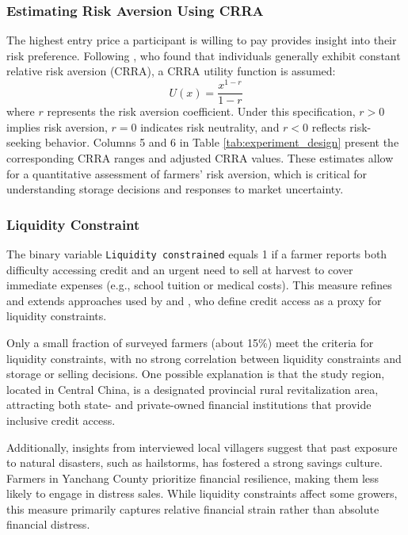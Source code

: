 \subsubsection{Estimating Risk Aversion Using CRRA}  
\noindent The highest entry price a participant is willing to pay provides insight into their risk preference. Following \cite{chiappori2011relative}, who found that individuals generally exhibit constant relative risk aversion (CRRA), a CRRA utility function is assumed:  
\[
U(x) = \frac{x^{1-r}}{1 - r}
\]  
where \( r \) represents the risk aversion coefficient. Under this specification, \( r > 0 \) implies risk aversion, \( r = 0 \) indicates risk neutrality, and \( r < 0 \) reflects risk-seeking behavior. Columns 5 and 6 in Table \ref{tab:experiment_design} present the corresponding CRRA ranges and adjusted CRRA values. These estimates allow for a quantitative assessment of farmers' risk aversion, which is critical for understanding storage decisions and responses to market uncertainty.  

\subsubsection{Liquidity Constraint}  
\noindent The binary variable \texttt{Liquidity constrained} equals 1 if a farmer reports both difficulty accessing credit and an urgent need to sell at harvest to cover immediate expenses (e.g., school tuition or medical costs). This measure refines and extends approaches used by \cite{albuquerque2024market} and \cite{stephens2011incomplete}, who define credit access as a proxy for liquidity constraints.  

Only a small fraction of surveyed farmers (about 15\%) meet the criteria for liquidity constraints, with no strong correlation between liquidity constraints and storage or selling decisions. One possible explanation is that the study region, located in Central China, is a designated provincial rural revitalization area, attracting both state- and private-owned financial institutions that provide inclusive credit access.  

Additionally, insights from interviewed local villagers suggest that past exposure to natural disasters, such as hailstorms, has fostered a strong savings culture. Farmers in Yanchang County prioritize financial resilience, making them less likely to engage in distress sales. While liquidity constraints affect some growers, this measure primarily captures relative financial strain rather than absolute financial distress.  




